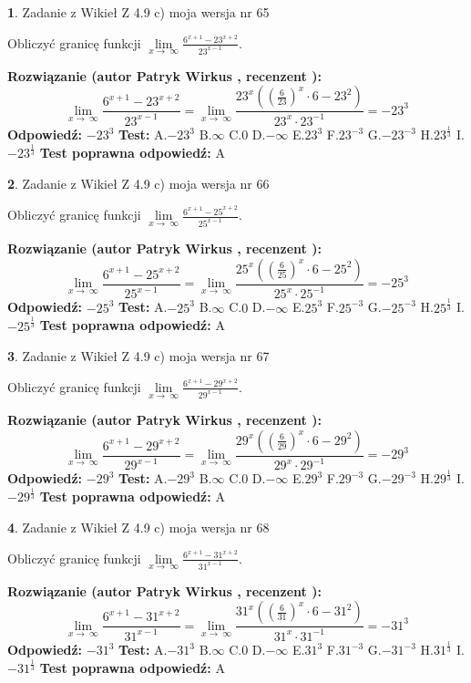 \documentclass[12pt, a4paper]{article}
\theoremstyle{definition} %
\newtheorem{zad}{}
\newcommand{\zadStart}[1]{\begin{zad}#1\newline}
\newcommand{\zadStop}{\end{zad}}
\newcommand{\rozwStart}[2]{\noindent \textbf{Rozwiązanie (autor #1 , recenzent #2): }\newline}
\newcommand{\rozwStop}{\newline}
\newcommand{\odpStart}{\noindent \textbf{Odpowiedź:}\newline}
\newcommand{\odpStop}{\newline}
\newcommand{\testStart}{\noindent \textbf{Test:}\newline}
\newcommand{\testStop}{\newline}
\newcommand{\kluczStart}{\noindent \textbf{Test poprawna odpowiedź:}\newline}
\newcommand{\kluczStop}{\newline}
\begin{document}
\zadStart{Zadanie z Wikieł Z 4.9 c) moja wersja nr 65}


Obliczyć granicę funkcji  $\lim\limits_{x\to\ \infty}\frac{6^{x+1}-23^{x+2}}{23^{x-1}}$.
\zadStop
\rozwStart{Patryk Wirkus}{}
$$\lim\limits_{x\to\ \infty}\frac{6^{x+1}-23^{x+2}}{23^{x-1}}=\lim\limits_{x\to\ \infty}\frac{23^{x}((\frac{6}{23})^{x}\cdot 6 -23^{2})}{23^{x}\cdot 23^{-1}} = -23^{3}$$
\rozwStop
\odpStart
$-23^{3}$
\odpStop
\testStart
A.$-23^{3}$ B.$\infty$ C.$0$ D.$-\infty$ E.$23^{3}$
F.$23^{-3}$ G.$-23^{-3}$
H.$23^{\frac{1}{3}}$
I.$-23^{\frac{1}{3}}$
\testStop
\kluczStart
A
\kluczStop



\zadStart{Zadanie z Wikieł Z 4.9 c) moja wersja nr 66}


Obliczyć granicę funkcji  $\lim\limits_{x\to\ \infty}\frac{6^{x+1}-25^{x+2}}{25^{x-1}}$.
\zadStop
\rozwStart{Patryk Wirkus}{}
$$\lim\limits_{x\to\ \infty}\frac{6^{x+1}-25^{x+2}}{25^{x-1}}=\lim\limits_{x\to\ \infty}\frac{25^{x}((\frac{6}{25})^{x}\cdot 6 -25^{2})}{25^{x}\cdot 25^{-1}} = -25^{3}$$
\rozwStop
\odpStart
$-25^{3}$
\odpStop
\testStart
A.$-25^{3}$ B.$\infty$ C.$0$ D.$-\infty$ E.$25^{3}$
F.$25^{-3}$ G.$-25^{-3}$
H.$25^{\frac{1}{3}}$
I.$-25^{\frac{1}{3}}$
\testStop
\kluczStart
A
\kluczStop



\zadStart{Zadanie z Wikieł Z 4.9 c) moja wersja nr 67}


Obliczyć granicę funkcji  $\lim\limits_{x\to\ \infty}\frac{6^{x+1}-29^{x+2}}{29^{x-1}}$.
\zadStop
\rozwStart{Patryk Wirkus}{}
$$\lim\limits_{x\to\ \infty}\frac{6^{x+1}-29^{x+2}}{29^{x-1}}=\lim\limits_{x\to\ \infty}\frac{29^{x}((\frac{6}{29})^{x}\cdot 6 -29^{2})}{29^{x}\cdot 29^{-1}} = -29^{3}$$
\rozwStop
\odpStart
$-29^{3}$
\odpStop
\testStart
A.$-29^{3}$ B.$\infty$ C.$0$ D.$-\infty$ E.$29^{3}$
F.$29^{-3}$ G.$-29^{-3}$
H.$29^{\frac{1}{3}}$
I.$-29^{\frac{1}{3}}$
\testStop
\kluczStart
A
\kluczStop



\zadStart{Zadanie z Wikieł Z 4.9 c) moja wersja nr 68}


Obliczyć granicę funkcji  $\lim\limits_{x\to\ \infty}\frac{6^{x+1}-31^{x+2}}{31^{x-1}}$.
\zadStop
\rozwStart{Patryk Wirkus}{}
$$\lim\limits_{x\to\ \infty}\frac{6^{x+1}-31^{x+2}}{31^{x-1}}=\lim\limits_{x\to\ \infty}\frac{31^{x}((\frac{6}{31})^{x}\cdot 6 -31^{2})}{31^{x}\cdot 31^{-1}} = -31^{3}$$
\rozwStop
\odpStart
$-31^{3}$
\odpStop
\testStart
A.$-31^{3}$ B.$\infty$ C.$0$ D.$-\infty$ E.$31^{3}$
F.$31^{-3}$ G.$-31^{-3}$
H.$31^{\frac{1}{3}}$
I.$-31^{\frac{1}{3}}$
\testStop
\kluczStart
A
\kluczStop
\end{document}
